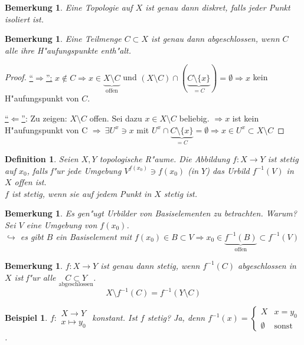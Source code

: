 \documentclass[a4paper,12pt,numbers=noenddot,parskip=full]{scrartcl}
\newcommand{\Exists}{~\exists}
\theoremstyle{dotless}
\newtheorem{definition}[theorem]{Definition}
\newtheorem{example}[theorem]{Beispiel}
\newtheorem{remark}[theorem]{Bemerkung}
\begin{document}
\begin{remark}
	Eine Topologie auf $X$ ist genau dann diskret,  falls jeder Punkt isoliert ist.
\end{remark}
\begin{remark}
	Eine Teilmenge $C \subset X$ ist genau dann abgeschlossen, wenn $C$ alle ihre H"aufungspunkte enth"alt.
\end{remark}
\begin{proof}
	\underline{"`$\Rightarrow$"':} $x \notin C \Rightarrow x \in \underbrace{X \setminus C}_{\text{offen}}$ und $(X \setminus C) \cap (\underbrace{C \setminus \{x\}}_{=C}) = \emptyset \Rightarrow x$ kein H"aufungspunkt von $C$.
	
	\underline{"`$\Leftarrow$"'}: Zu zeigen: $X \setminus C$ offen. Sei dazu $x \in X \setminus C$ beliebig. $\Rightarrow x$ ist kein H"aufungspunkt von C $\Rightarrow \Exists U^x \ni x$ mit $U^x \cap \underbrace{C \setminus \{x\}}_{= C} = \emptyset \Rightarrow x \in U^x \subset X \setminus C$
\end{proof}
\begin{definition}
	Seien $X, Y$ topologische R"aume. Die Abbildung $f: X \longrightarrow Y$ ist \emph{stetig auf $x_0$}, falls f"ur jede Umgebung $V^{f(x_0)} \ni f(x_0)$ (in $Y$) das Urbild $f^{-1}(V)$ in $X$ offen ist.\\
	$f$ ist stetig, wenn sie auf jedem Punkt in $X$ stetig ist.
\end{definition}
\begin{remark}
	Es gen"ugt Urbilder von Basiselementen zu betrachten. Warum? Sei $V$ eine Umgebung von $f(x_0)$.\\
	$\hookrightarrow$ es gibt $B$ ein Basiselement mit $f(x_0) \in B \subset V \Rightarrow x_0 \in \underbrace{f^{-1}(B)}_{\text{offen}} \subset f^{-1}(V)$
\end{remark}
\begin{remark}
	$f: X \longrightarrow Y$ ist genau dann stetig, wenn $f^{-1}(C)$ abgeschlossen in $X$ ist f"ur alle $\underset{\text{abgeschlossen}}{C \subset Y}$.
	\begin{equation*}
		X \setminus f^{-1}(C) = f^{-1}(Y \setminus C)
	\end{equation*}
\end{remark}
\begin{example}
	$f: \begin{array}{c}
		X \longrightarrow Y\\
		x \longmapsto y_0
	\end{array}$ konstant. Ist $f$ stetig? Ja, denn $f^{-1}(x) = \begin{cases}
		X &x=y_0\\
		\emptyset &\text{sonst}
	\end{cases}$.
\end{example}
\end{document}
